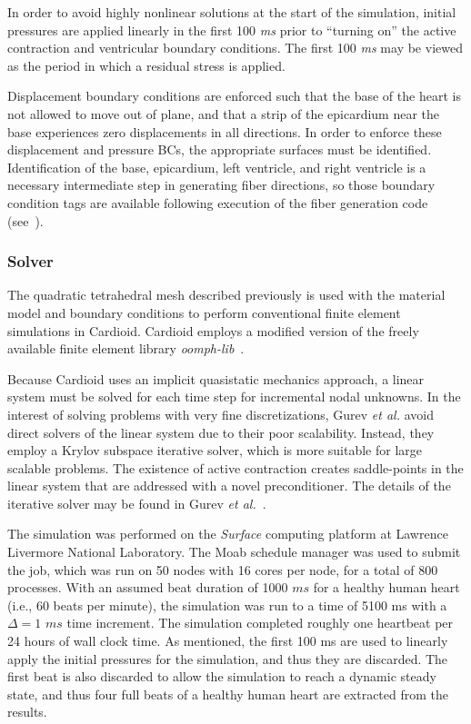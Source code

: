 In order to avoid highly nonlinear solutions at the start of the simulation, initial pressures are applied linearly in the first 100 \textit{ms} prior to ``turning on'' the active contraction and ventricular boundary conditions. The first 100 \textit{ms} may be viewed as the period in which a residual stress is applied.

Displacement boundary conditions are enforced such that the base of the heart is not allowed to move out of plane, and that a strip of the epicardium near the base experiences zero displacements in all directions. In order to enforce these displacement and pressure BCs, the appropriate surfaces must be identified. Identification of the base, epicardium, left ventricle, and right ventricle is a necessary intermediate step in generating fiber directions, so those boundary condition tags are available following execution of the fiber generation code (see~).

\subsubsection{Solver}
\label{Solver}

The quadratic tetrahedral mesh described previously is used with the material model and boundary conditions to perform conventional finite element simulations in Cardioid. Cardioid employs a modified version of the freely available finite element library \textit{oomph-lib}~\cite{oomph}.

Because Cardioid uses an implicit quasistatic mechanics approach, a linear system must be solved for each time step for incremental nodal unknowns. In the interest of solving problems with very fine discretizations, Gurev \textit{et al.} avoid direct solvers of the linear system due to their poor scalability. Instead, they employ a Krylov subspace iterative solver, which is more suitable for large scalable problems. The existence of active contraction creates saddle-points in the linear system that are addressed with a novel preconditioner. The details of the iterative solver may be found in Gurev \textit{et al.}~\cite{gurev_2015}.

The simulation was performed on the \textit{Surface} computing platform at Lawrence Livermore National Laboratory. The Moab schedule manager was used to submit the job, which was run on 50 nodes with 16 cores per node, for a total of 800 processes. With an assumed beat duration of 1000 $ms$ for a healthy human heart (i.e., 60 beats per minute), the simulation was run to a time of 5100 ms with a $\Delta = 1$ $ms$ time increment. The simulation completed roughly one heartbeat per 24 hours of wall clock time. As mentioned, the first 100 ms are used to linearly apply the initial pressures for the simulation, and thus they are discarded. The first beat is also discarded to allow the simulation to reach a dynamic steady state, and thus four full beats of a healthy human heart are extracted from the results.

